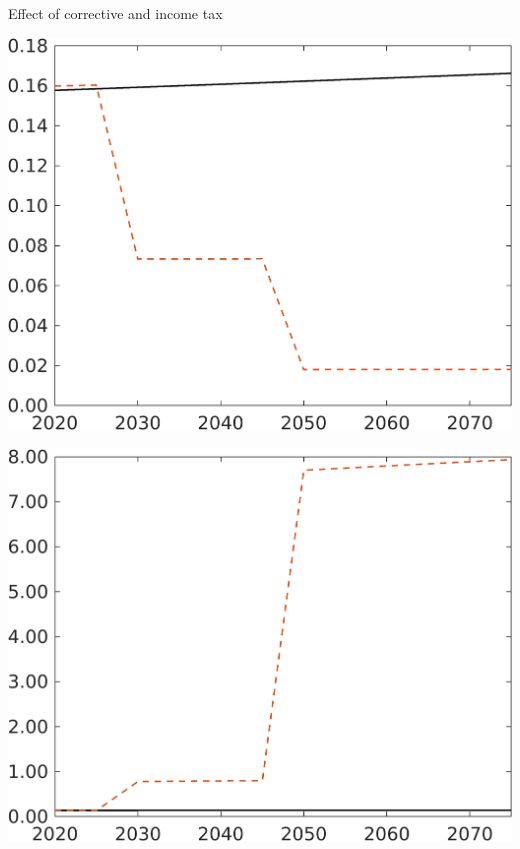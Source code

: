 \documentclass[11pt,aspectratio=169]{beamer}
\begin{document}
\begin{frame}{Effect of corrective and income tax}
\begin{minipage}[]{0.3\textwidth}
	\end{minipage}
	\begin{minipage}[]{0.3\textwidth}
		\includegraphics[width=1\textwidth]{../codding_model/own_basedOnFried/optimalPol_elastS_DisuSci/figures/all_1705/CompCounterFac_withLF_noopt_taufopt1_taulopt0_F_spillover0_noskill0_sep1_BN0_ineq0_red0_xgrowth0_etaa0.79_lgd0.png}
	\end{minipage}
	\begin{minipage}[]{0.3\textwidth}
		\includegraphics[width=1\textwidth]{../codding_model/own_basedOnFried/optimalPol_elastS_DisuSci/figures/all_1705/CompCounterFac_withLF_noopt_taufopt1_taulopt0_GFF_spillover0_noskill0_sep1_BN0_ineq0_red0_xgrowth0_etaa0.79_lgd0.png}

\end{minipage}
\end{frame}
\end{document}
